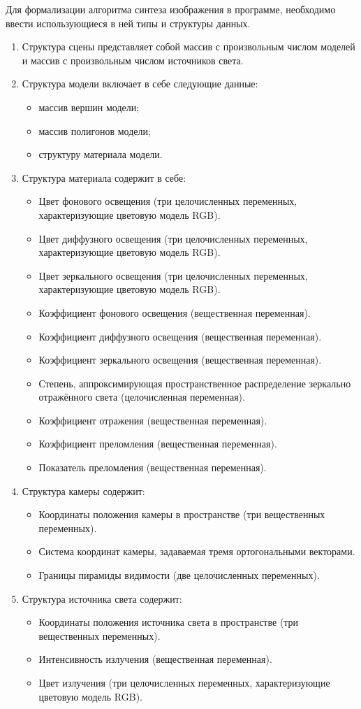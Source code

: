 Для формализации алгоритма синтеза изображения в программе, необходимо ввести использующиеся в ней типы и структуры данных.
\begin{enumerate}[label=\arabic*)]
	\item Структура сцены представляет собой массив с произвольным числом моделей и массив с произвольным числом источников света.
	\item Структура модели включает в себе следующие данные:
	\begin{itemize}
		\item массив вершин модели;
		\item массив полигонов модели;
		\item структуру материала модели.
	\end{itemize}
	\item Структура материала содержит в себе:
	\begin{itemize}
		\item Цвет фонового освещения (три целочисленных переменных, характеризующие цветовую модель RGB).
		\item Цвет диффузного освещения (три целочисленных переменных, характеризующие цветовую модель RGB).
		\item Цвет зеркального освещения (три целочисленных переменных, характеризующие цветовую модель RGB).
		\item Коэффициент фонового освещения (вещественная переменная).
		\item Коэффициент диффузного освещения (вещественная переменная).
		\item Коэффициент зеркального освещения (вещественная переменная).
		\item Степень, аппроксимирующая пространственное распределение зеркально отражённого света (целочисленная переменная).
		\item Коэффициент отражения (вещественная переменная).
		\item Коэффициент преломления (вещественная переменная).
		\item Показатель преломления (вещественная переменная).
	\end{itemize}
	\item Структура камеры содержит:
	\begin{itemize}
		\item Координаты положения камеры в пространстве (три вещественных переменных).
		\item Система координат камеры, задаваемая тремя ортогональными векторами.
		\item Границы пирамиды видимости (две целочисленных переменных).
	\end{itemize}
	\item Структура источника света содержит:
	\begin{itemize}
		\item Координаты положения источника света в пространстве (три вещественных переменных).
		\item Интенсивность излучения (вещественная переменная).
		\item Цвет излучения (три целочисленных переменных, характеризующие цветовую модель RGB).
	\end{itemize}
\end{enumerate}

